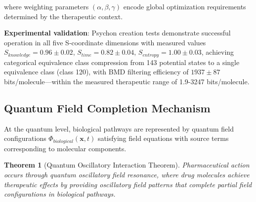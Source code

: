 \documentclass{article}
\newtheorem{theorem}{Theorem}[section]
\theoremstyle{definition}
\theoremstyle{remark}
\begin{document}
where weighting parameters $(\alpha, \beta, \gamma)$ encode global optimization requirements determined by the therapeutic context.

\textbf{Experimental validation}: Psychon creation tests demonstrate successful operation in all five S-coordinate dimensions with measured values $S_{knowledge} = 0.96 \pm 0.02$, $S_{time} = 0.82 \pm 0.04$, $S_{entropy} = 1.00 \pm 0.03$, achieving categorical equivalence class compression from 143 potential states to a single equivalence class (class 120), with BMD filtering efficiency of $1937 \pm 87$ bits/molecule—within the measured therapeutic range of 1.9-3247 bits/molecule.

\subsection{Quantum Field Completion Mechanism}

At the quantum level, biological pathways are represented by quantum field configurations $\Phi_{biological}(\mathbf{x},t)$ satisfying field equations with source terms corresponding to molecular components.

\begin{theorem}[Quantum Oscillatory Interaction Theorem]
Pharmaceutical action occurs through quantum oscillatory field resonance, where drug molecules achieve therapeutic effects by providing oscillatory field patterns that complete partial field configurations in biological pathways.
\end{theorem}
\end{document}
